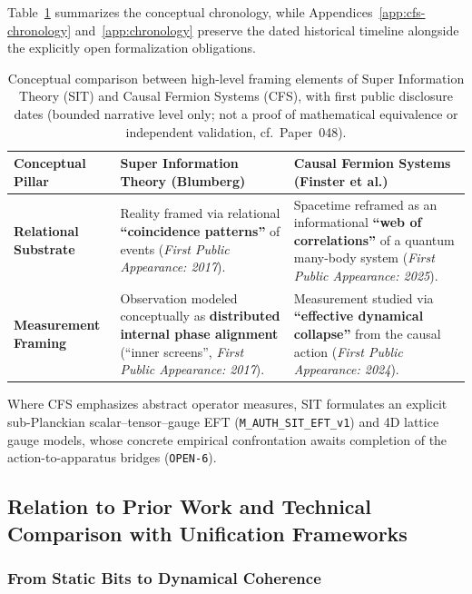 Table~\ref{tab:sot-cfs-map} summarizes the conceptual chronology, while Appendices~\ref{app:cfs-chronology} and~\ref{app:chronology} preserve the dated historical timeline alongside the explicitly open formalization obligations.

\begin{table}[htbp]
\centering
\caption{Conceptual comparison between high-level framing elements of Super Information Theory (SIT) and Causal Fermion Systems (CFS), with first public disclosure dates (bounded narrative level only; not a proof of mathematical equivalence or independent validation, cf.\ Paper~048).}
\label{tab:sot-cfs-map}
\vspace{0.4em}
\begin{tabular}{|p{3.0cm}|p{5.8cm}|p{5.8cm}|}
\hline
\textbf{Conceptual Pillar} & \textbf{Super Information Theory (Blumberg)} & \textbf{Causal Fermion Systems (Finster et al.)} \\
\hline
\textbf{Relational Substrate} & Reality framed via relational \textbf{``coincidence patterns''} of events (\emph{First Public Appearance: 2017}). & Spacetime reframed as an informational \textbf{``web of correlations''} of a quantum many-body system (\emph{First Public Appearance: 2025}). \\
\hline
\textbf{Measurement Framing} & Observation modeled conceptually as \textbf{distributed internal phase alignment} (``inner screens'', \emph{First Public Appearance: 2017}). & Measurement studied via \textbf{``effective dynamical collapse''} from the causal action (\emph{First Public Appearance: 2024}). \\
\hline
\end{tabular}
\end{table}

Where CFS emphasizes abstract operator measures, SIT formulates an explicit sub-Planckian scalar--tensor--gauge EFT (\texttt{M\_AUTH\_SIT\_EFT\_v1}) and 4D lattice gauge models, whose concrete empirical confrontation awaits completion of the action-to-apparatus bridges (\texttt{OPEN-6}).

\subsection{Relation to Prior Work and Technical Comparison with Unification Frameworks}
\label{sec:relation-prior-work}
\label{sec:SITTechnicalComparison}

\subsubsection{From Static Bits to Dynamical Coherence}

